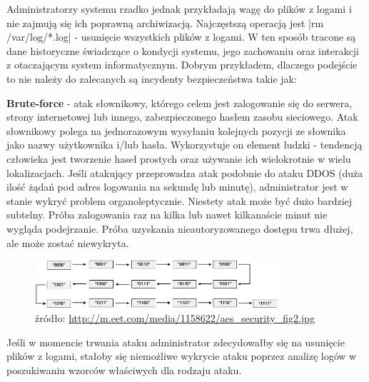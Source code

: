         Administratorzy systemu rzadko jednak przykładają wagę do plików z logami i nie zajmują się ich poprawną archiwizacją. 
        Najczęstszą operacją jest |rm /var/log/*.log| - usunięcie wszystkich plików z logami. W ten sposób
        tracone są dane historyczne świadczące o kondycji systemu, jego zachowaniu oraz interakcji z otaczającym system informatycznym.
        Dobrym przykładem, dlaczego podejście to nie należy do zalecanych są incydenty bezpieczeństwa takie jak:
        
        \textbf{Brute-force}\cite{brute_force_attack} - atak słownikowy, którego celem jest zalogowanie się do serwera, strony internetowej lub innego, zabezpieczonego
        hasłem zasobu sieciowego. Atak słownikowy polega na jednorazowym wysyłaniu kolejnych pozycji ze słownika jako nazwy użytkownika i/lub
        hasła. Wykorzystuje on element ludzki - tendencją człowieka jest tworzenie haseł prostych oraz używanie ich wielokrotnie w wielu
        lokalizacjach. Jeśli atakujący przeprowadza atak podobnie do ataku DDOS (duża ilość żądań pod adres logowania na sekundę lub minutę),
        administrator jest w stanie wykryć problem organoleptycznie. Niestety atak może być dużo bardziej subtelny. Próba zalogowania raz
        na kilka lub nawet kilkanaście minut nie wygląda podejrzanie. Próba uzyskania nieautoryzowanego dostępu trwa dłużej, ale może zostać niewykryta.
        
        \begin{figure}[H]
          \centering
          \includegraphics[width=0.80\textwidth]{images/brute_force}
          \caption[Schemat ataku brute-force]{
              źródło: \url{http://m.eet.com/media/1158622/aes_security_fig2.jpg}
            }
            \label{chapter:logs:collecting:brute_force}
        \end{figure}
        
        Jeśli w momencie trwania ataku administrator zdecydowałby się na usunięcie plików z logami, stałoby się niemożliwe wykrycie ataku poprzez analizę logów w poszukiwaniu wzorców właściwych dla rodzaju ataku.
        
